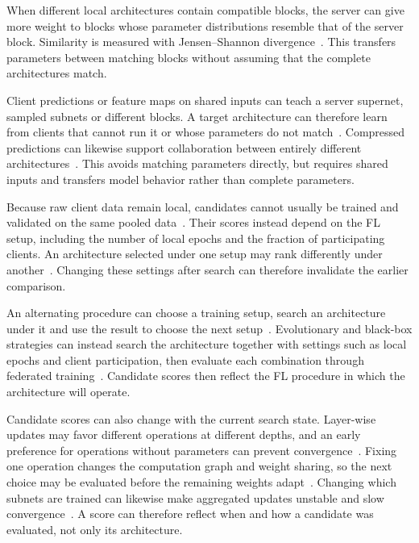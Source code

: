  When different local architectures contain compatible blocks, the server can give more weight to blocks whose parameter distributions resemble that of the server block. Similarity is measured with Jensen--Shannon divergence~\cite{f2nas_2024}. This transfers parameters between matching blocks without assuming that the complete architectures match.

 Client predictions or feature maps on shared inputs can teach a server supernet, sampled subnets or different blocks. A target architecture can therefore learn from clients that cannot run it or whose parameters do not match~\cite{f2nas_2024,hapfnas_2025,collaborative_nas_for_pfl_2025}. Compressed predictions can likewise support collaboration between entirely different architectures~\cite{hetefed_2023}. This avoids matching parameters directly, but requires shared inputs and transfers model behavior rather than complete parameters.


Because raw client data remain local, candidates cannot usually be trained and validated on the same pooled data~\cite{fl_advances_and_open_problems_2021}. Their scores instead depend on the FL setup, including the number of local epochs and the fraction of participating clients. An architecture selected under one setup may rank differently under another~\cite{feathers_2023,aging_fednas_2025,breastcancer_fednas_2024}. Changing these settings after search can therefore invalidate the earlier comparison.

 An alternating procedure can choose a training setup, search an architecture under it and use the result to choose the next setup~\cite{feathers_2023}. Evolutionary and black-box strategies can instead search the architecture together with settings such as local epochs and client participation, then evaluate each combination through federated training~\cite{aging_fednas_2025,breastcancer_fednas_2024}. Candidate scores then reflect the FL procedure in which the architecture will operate.

Candidate scores can also change with the current search state. Layer-wise updates may favor different operations at different depths, and an early preference for operations without parameters can prevent convergence~\cite{remote_sensing_fednas_2025}. Fixing one operation changes the computation graph and weight sharing, so the next choice may be evaluated before the remaining weights adapt~\cite{spider_2021}. Changing which subnets are trained can likewise make aggregated updates unstable and slow convergence~\cite{divide-and-conquer_fednas_2023}. A score can therefore reflect when and how a candidate was evaluated, not only its architecture.

